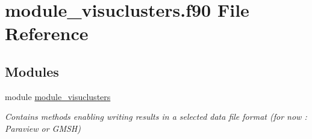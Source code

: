 \hypertarget{module__visuclusters_8f90}{}\section{module\+\_\+visuclusters.\+f90 File Reference}
\label{module__visuclusters_8f90}
\subsection*{Modules}
\begin{DoxyCompactItemize}
\item 
module \hyperlink{namespacemodule__visuclusters}{module\+\_\+visuclusters}
\begin{DoxyCompactList}\small\item\em Contains methods enabling writing results in a selected data file format (for now \+: Paraview or G\+M\+S\+H) \end{DoxyCompactList}\end{DoxyCompactItemize}
